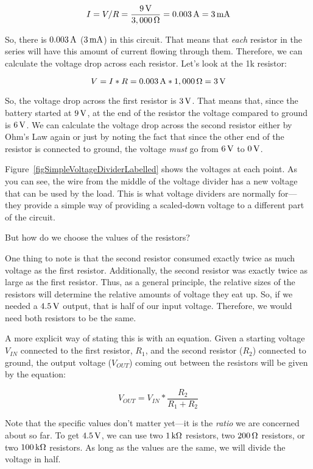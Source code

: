 $$ I = V / R = \frac{9\,\si{\volt}}{3,000\,\si{\ohm}} = 0.003\,\si{\ampere} = 3\,\si{\milli\ampere} $$

So, there is $0.003\,\si{\ampere}$ ($3\,\si{\milli\ampere}$) in this circuit.
That means that \emph{each} resistor in the series will have this amount of current flowing through them.
Therefore, we can calculate the voltage drop across each resistor.
Let's look at the 1k resistor:

$$ V = I * R = 0.003\,\si{\ampere} * 1,000\,\si{\ohm} = 3\,\si{\volt} $$

So, the voltage drop across the first resistor is $3\,\si{\volt}$.
That means that, since the battery started at $9\,\si{\volt}$, at the end of the resistor the voltage compared to ground is $6\,\si{\volt}$.
We can calculate the voltage drop across the second resistor either by Ohm's Law again or just by noting the fact that since the other end of the resistor is connected to ground, the voltage \emph{must} go from $6\,\si{\volt}$ to $0\,\si{\volt}$.


Figure~\ref{figSimpleVoltageDividerLabelled} shows the voltages at each point.
As you can see, the wire from the middle of the voltage divider has a new voltage that can be used by the load.
This is what voltage dividers are normally for---they provide a simple way of providing a scaled-down voltage to a different part of the circuit.

But how do we choose the values of the resistors?

One thing to note is that the second resistor consumed exactly twice as much voltage as the first resistor.
Additionally, the second resistor was exactly twice as large as the first resistor.
Thus, as a general principle, the relative sizes of the resistors will determine the relative amounts of voltage they eat up.
So, if we needed a $4.5\,\si{\volt}$ output, that is half of our input voltage.
Therefore, we would need both resistors to be the same.

A more explicit way of stating this is with an equation.
Given a starting voltage $V_{IN}$ connected to the first resistor, $R_1$, and the second resistor ($R_2$) connected to ground, the output voltage ($V_{OUT}$) coming out between the resistors will be given by the equation:

\begin{equation}
V_{OUT} = V_{IN} * \frac{R_2}{R_1 + R_2}
\end{equation}

Note that the specific values don't matter yet---it is the \emph{ratio} we are concerned about so far.
To get $4.5\,\si{\volt}$, we can use two $1\,\si{\kilo\ohm}$ resistors, two $200\,\si{\ohm}$ resistors, or two $100\,\si{\kilo\ohm}$ resistors.
As long as the values are the same, we will divide the voltage in half.

